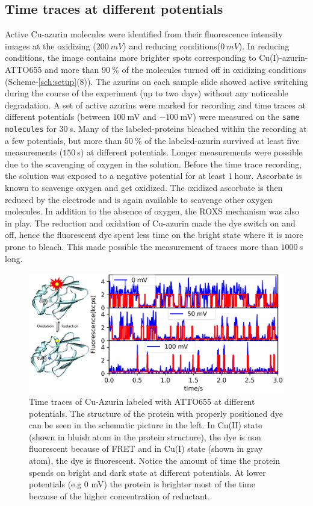 \documentclass[journal=jacsat,manuscript=article]{achemso}
\begin{document}
\subsection{Time traces at different potentials}
Active Cu-azurin molecules were identified from their fluorescence intensity images at the oxidizing ($200~mV$) and reducing conditions($0~mV$). In reducing conditions, the image contains more brighter spots corresponding to Cu(I)-azurin-ATTO655 and more than $90~\%$ of the molecules turned off in oxidizing conditions (Scheme-\ref{sch:setup}(8)). The azurins on each sample slide showed active switching during the course of the experiment (up to two days) without any noticeable degradation. A set of active azurins were marked for recording and time traces at different potentials (between $100~$mV and $-100~$mV) were measured on the \texttt{same molecules} for $30~$s. Many of the labeled-proteins bleached within the recording at a few potentials, but more than $50~$\% of the labeled-azurin survived at least five measurements ($150~$s) at different potentials. Longer measurements were possible due to the scavenging of oxygen in the solution. Before the time trace recording, the solution was exposed to a negative potential for at least $1~$hour. Ascorbate is known to  scavenge oxygen\cite{dave1997effectiveness} and get oxidized. The oxidized ascorbate is then reduced by the electrode and is again available to scavenge other oxygen molecules. In addition to the absence of oxygen, the ROXS mechanism was also in play. The reduction and oxidation of Cu-azurin made the dye switch on and off, hence the fluorescent dye spent less time on the bright state where it is more prone to bleach. This made possible the measurement of traces more than $1000~$s long.\\
\begin{figure}
	\centering
	\includegraphics[]{Figure_1_timetrace_CuAzu.eps}
	\caption{Time traces of Cu-Azurin labeled with ATTO655 at different potentials. The structure of the protein with properly positioned dye can be seen in the schematic picture in the left. In Cu(II) state (shown in bluish atom in the protein structure), the dye is non fluorescent because of FRET and in Cu(I) state (shown in gray atom), the dye is fluorescent. Notice the amount of time the protein spends on bright and dark state at different potentials. At lower potentials (e.g 0 mV) the protein is brighter most of the time because of the higher concentration of reductant.}
	\label{fig:timetrace}
\end{figure}
\end{document}
